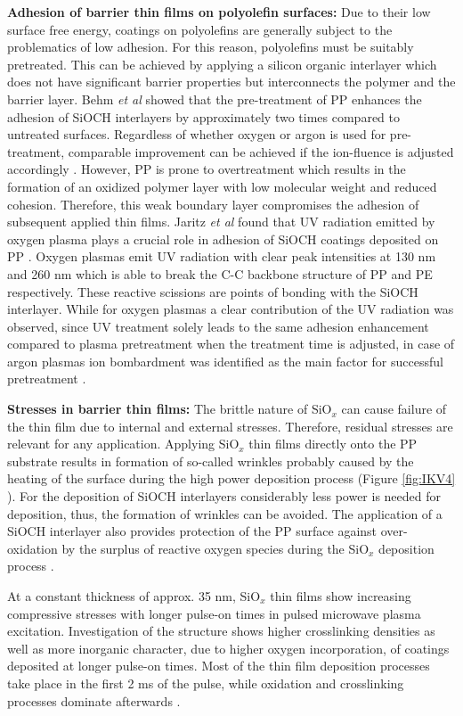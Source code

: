 \documentclass[AMA,STIX2COL]{WileyNJD-v2} %
\begin{document}
\textbf{Adhesion of barrier thin films on polyolefin surfaces:} Due to their low surface free energy, coatings on polyolefins are generally subject to the problematics of low adhesion. For this reason, polyolefins must be suitably pretreated. This can be achieved by applying a silicon organic interlayer which does not have significant barrier properties but interconnects the polymer and the barrier layer. Behm \textit{et al} showed that the pre-treatment of PP enhances the adhesion of SiOCH interlayers by approximately two times compared to untreated surfaces. Regardless of whether oxygen or argon is used for pre-treatment, comparable improvement can be achieved if the ion-fluence is adjusted accordingly \cite{Behm.2014}. However, PP is prone to overtreatment which results in the formation of an oxidized polymer layer with low molecular weight and reduced cohesion. Therefore, this weak boundary layer compromises the adhesion of subsequent applied thin films. Jaritz \textit{et al} found that UV radiation emitted by oxygen plasma plays a crucial role in adhesion of SiOCH coatings deposited on PP \cite{Jaritz.2017b}.  Oxygen plasmas emit UV radiation with clear peak intensities at 130 nm and 260 nm which is able to break the C-C backbone structure of PP and PE respectively. These reactive scissions are points of bonding with the SiOCH interlayer. While for oxygen plasmas a clear contribution of the UV radiation was observed, since UV treatment solely leads to the same adhesion enhancement compared to plasma pretreatment when the treatment time is adjusted, in case of argon plasmas ion bombardment was identified as the main factor for successful pretreatment \cite{Jaritz.2017b}.

\textbf{Stresses in barrier thin films:} The brittle nature of SiO$_x$ can cause failure of the thin film due to internal and external stresses. Therefore, residual stresses are relevant for any application. Applying SiO$_x$ thin films directly onto the PP substrate results in formation of so-called wrinkles probably caused by the heating of the surface during the high power deposition process (Figure \ref{fig:IKV4} ). For the deposition of SiOCH interlayers considerably less power is needed for deposition, thus, the formation of wrinkles can be avoided. The application of a SiOCH interlayer also provides protection of the PP surface against over-oxidation by the surplus of reactive oxygen species during the SiO$_x$ deposition process \cite{Jaritz.2017}.

At a constant thickness of approx. 35 nm, SiO$_x$ thin films show increasing compressive stresses with longer pulse-on times in pulsed microwave plasma excitation. Investigation of the structure shows higher crosslinking densities as well as more inorganic character, due to higher oxygen incorporation, of coatings deposited at longer pulse-on times. Most of the thin film deposition processes take place in the first 2 ms of the pulse, while oxidation and crosslinking processes dominate afterwards \cite{Jaritz.2017}.
\end{document}
